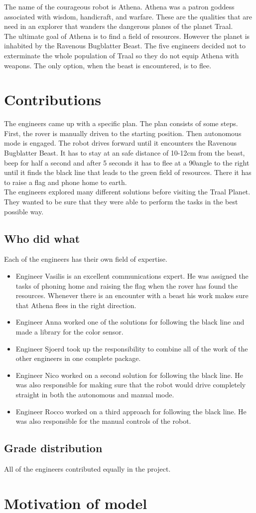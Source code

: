 \documentclass[a4paper,12pt]{article}
\begin{document}
\noindent The name of the courageous robot is Athena. Athena was a patron goddess associated with wisdom, handicraft, and warfare. These are the qualities that are need in an explorer that wanders the dangerous planes of the planet Traal.\\

\noindent The ultimate goal of Athena is to find a field of resources. However the planet is inhabited by the Ravenous Bugblatter Beast. The five engineers decided not to exterminate the whole population of Traal so they do not equip Athena with weapons. The only option, when the beast is encountered, is to flee.

\section{Contributions}
The engineers came up with a specific plan. The plan consists of some steps. First, the rover is manually driven to the starting position. Then autonomous mode is engaged. The robot drives forward until it encounters the Ravenous Bugblatter Beast. It has to stay at an safe distance of 10-12cm from the beast, beep for half a second and after 5 seconds it has to flee at a 90\degree angle to the right until it finds the black line that leads to the green field of resources. There it has to raise a flag and phone home to earth.\\

\noindent The engineers explored many different solutions before visiting the Traal Planet. They wanted to be sure that they were able to perform the tasks in the best possible way.
\subsection{Who did what}
Each of the engineers has their own field of expertise.\\
\begin{itemize}
    \item Engineer Vasilis is an excellent communications expert. He was assigned the tasks of phoning home and raising the flag when the rover has found the resources. Whenever there is an encounter with a beast his work makes sure that Athena flees in the right direction.
    \item Engineer Anna worked one of the solutions for following the black line and made a library for the color sensor.
    \item Engineer Sjoerd took up the responsibility to combine all of the work of the other engineers in one complete package.
    \item Engineer Nico worked on a second solution for following the black line. He was also responsible for making sure that the robot would drive completely straight in both the autonomous and manual mode.
    \item Engineer Rocco worked on a third approach for following the black line. He was also responsible for the manual controls of the robot.
\end{itemize}
\subsection{Grade distribution}
All of the engineers contributed equally in the project. 
\section{Motivation of model}




\end{document}
